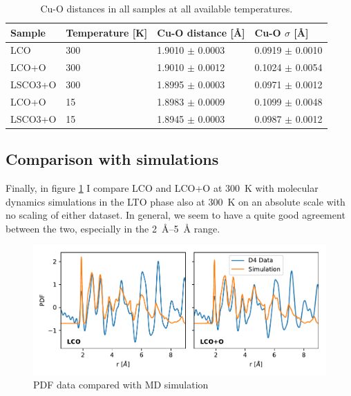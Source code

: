 \begin{table}
    \centering
    \begin{tabular}{llll}
        \toprule
          Sample & Temperature [K] &        Cu-O distance [\AA] &           Cu-O $\sigma$ [\AA] \\
        \midrule
             LCO &         300 &  1.9010 $\pm$ 0.0003 &  0.0919 $\pm$ 0.0010 \\
           LCO+O &         300 &  1.9010 $\pm$ 0.0012 &  0.1024 $\pm$ 0.0054 \\
         LSCO3+O &         300 &  1.8995 $\pm$ 0.0003 &  0.0971 $\pm$ 0.0012 \\
           LCO+O &          15 &  1.8983 $\pm$ 0.0009 &  0.1099 $\pm$ 0.0048 \\
         LSCO3+O &          15 &  1.8945 $\pm$ 0.0003 &  0.0987 $\pm$ 0.0012 \\
        \bottomrule
    \end{tabular}    
    \caption{Cu-O distances in all samples at all available temperatures.}
    \label{tab:cu_o_fits}
\end{table}

\subsection{Comparison with simulations}
Finally, in figure \ref{fig:pdf_sim_comparision} I compare LCO and LCO+O at \SI{300}{\kelvin} with molecular dynamics simulations in the LTO phase also at \SI{300}{\kelvin} on an absolute scale with no scaling of either dataset. In general, we seem to have a quite good agreement between the two, especially in the \SIrange{2}{5}{\angstrom} range.

\begin{figure}
    \centering
    \includegraphics[width=\textwidth]{fig/pdf/pdf_simulation_experiment_compare.pdf}
    \caption[PDF data compared with MD simulation]{PDF data compared with MD simulation}
    \label{fig:pdf_sim_comparision}
\end{figure}